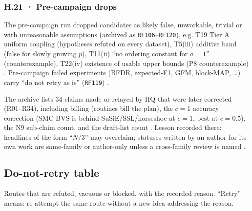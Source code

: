 \subsubsection*{H.21 · Pre-campaign drops}
The pre-campaign run dropped candidates as likely false, unworkable, trivial or with unreasonable assumptions (archived as \texttt{RF106}--\texttt{RF120}), e.g. T19 Tier A uniform coupling (hypotheses refuted on every dataset), T5(iii) additive band (false for slowly growing $p$), T11(ii) ``no ordering constant for $a=1$'' (counterexample), T22(iv) existence of usable upper bounds (P8 counterexample) . Pre-campaign failed experiments (BFDR, expected-F1, GFM, block-MAP, \dots) carry ``do not retry as is'' (\texttt{RF119}) .

\begin{agentnote}
The archive lists 34 claims made or relayed by HQ that were later corrected (R01--R34), including billing (routines bill the plan), the $c=1$ accuracy correction (SMC-BVS is behind SuSiE/SSL/horseshoe at $c=1$, best at $c=0.5$), the N9 sub-claim count, and the draft-list count . Lesson recorded there: headlines of the form ``$N/3$'' may overclaim; statuses written by an author for its own work are same-family or author-only unless a cross-family review is named .
\end{agentnote}

\subsection{Do-not-retry table}\label{sec:history:dead}

Routes that are refuted, vacuous or blocked, with the recorded reason. ``Retry'' means: re-attempt the same route without a new idea addressing the reason.

